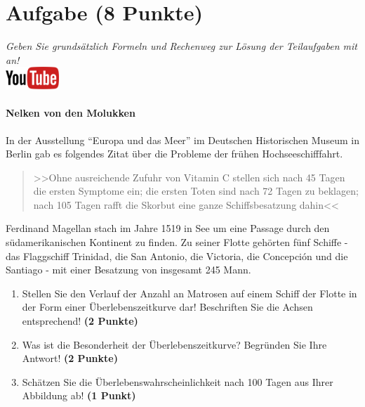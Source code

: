 \documentclass[a4paper, 9pt]{scrartcl}\usepackage[]{graphicx}\usepackage[]{xcolor}
\begin{document}
 
\clearpage

\section{Aufgabe \hfill (8 Punkte)}

\textit{Geben Sie grunds{\"a}tzlich Formeln und Rechenweg zur L{\"o}sung der
  Teilaufgaben mit an!} \\[1Ex]

\hfill\href{https://youtu.be/1B53cVFIU7Q}{\includegraphics[width =
  2cm]{img/youtube}} %
\hspace{2Ex}

\paragraph{Nelken von den Molukken}



In der Ausstellung "`Europa und das Meer"' im Deutschen Historischen Museum in
Berlin gab es folgendes Zitat {\"u}ber die Probleme der fr{\"u}hen Hochseeschifffahrt.

\begin{quote}
  >>Ohne ausreichende Zufuhr von Vitamin C stellen sich nach 45 Tagen die
  ersten Symptome ein; die ersten Toten sind nach 72 Tagen zu beklagen;
  nach 105 Tagen rafft die Skorbut eine ganze Schiffsbesatzung dahin<<
\end{quote}

Ferdinand Magellan stach im Jahre 1519 in See um eine Passage durch den
s{\"u}damerikanischen Kontinent zu finden. Zu seiner Flotte geh{\"o}rten
f{\"u}nf Schiffe - das Flaggschiff Trinidad, die San Antonio, die Victoria, die
Concepci{\'o}n und die Santiago - mit einer Besatzung von insgesamt
245 Mann. 

\begin{enumerate}
\item Stellen Sie den Verlauf der Anzahl an Matrosen auf einem Schiff der
  Flotte in der Form einer {\"U}berlebenszeitkurve dar! Beschriften Sie die
  Achsen entsprechend! \textbf{(2 Punkte)} 
\item Was ist die Besonderheit der Überlebenszeitkurve? Begründen Sie Ihre Antwort! \textbf{(2 Punkte)} 
\item Sch{\"a}tzen Sie die {\"U}berlebenswahrscheinlichkeit nach 100 Tagen
  aus Ihrer Abbildung ab! \textbf{(1 Punkt)} 
\end{enumerate}
\end{document}
